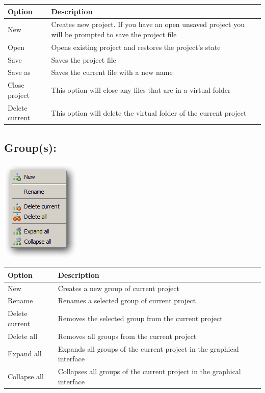 \begin{scriptsize}\begin{tabularx}{\textwidth}{>{\hsize=0.2\hsize}X>{\hsize=0.8\hsize}X}\\
    \hline
    \textbf{Option} & \textbf{Description} \\
    \hline
    New & Creates new project. If you have an open unsaved project you will be prompted to save the project file \\
    Open & Opens existing project and restores the project's state \\
    Save & Saves the project file \\
    Save as & Saves the current file with a new name \\
    Close project & This option will close any files that are in a virtual folder \\
    Delete current & This option will delete the virtual folder of the current project \\
    \hline
  \end{tabularx}\end{scriptsize}


\hypertarget{menu_project_group}{}
\subsection{Group(s):}

\includegraphics[scale=0.50]{./res/menu_project_group.png}\\

\begin{scriptsize}\begin{tabularx}{\textwidth}{>{\hsize=0.2\hsize}X>{\hsize=0.8\hsize}X}\\
    \hline
    \textbf{Option} & \textbf{Description} \\
    \hline
    New & Creates a new group of current project \\
    Rename & Renames a selected group of current project \\
    Delete current & Removes the selected group from the current project \\
    Delete all & Removes all groups from the current project \\
    Expand all & Expands all groups of the current project in the graphical interface \\
    Collapse all & Collapses all groups of the current project in the graphical interface \\
    \hline
  \end{tabularx}\end{scriptsize}


